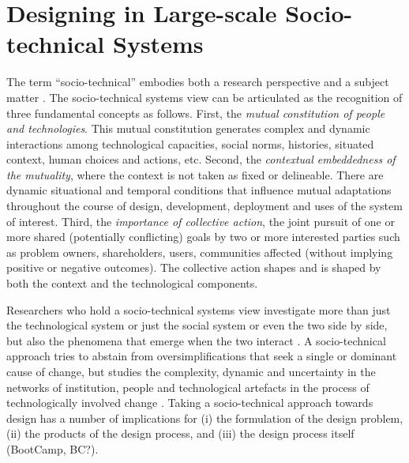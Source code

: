 \section{Designing in Large-scale Socio-technical Systems}
\label{sec:design}

The term ``socio-technical'' embodies both a research perspective and a subject matter \cite{Lee2001}.
The socio-technical systems view can be articulated as the recognition of three fundamental concepts \cite{Sawyer2014} as follows. 
%
First, the \textit{mutual constitution of people and technologies}. This mutual constitution generates complex and dynamic interactions among technological capacities, social norms, histories, situated context, human choices and actions, etc. 
%
Second, the \textit{contextual embeddedness of the mutuality}, where the context is not taken as fixed or delineable. There are dynamic situational and temporal conditions that influence 
mutual adaptations throughout the course of design, development, deployment and uses of the system of interest. 
% 
Third, the \textit{importance of collective action}, the joint pursuit of one or more shared (potentially conflicting) goals by two or more interested parties such as problem owners, shareholders, users, communities affected (without implying positive or negative outcomes). The collective action shapes and is shaped by both the context and the technological components. 

Researchers who hold a socio-technical systems view investigate more than just the technological system or just the social system or even the two side by side, but also the phenomena that emerge when the two interact \cite{Lee2001}. A socio-technical approach tries to abstain from oversimplifications that seek a single or dominant cause of change, but studies the complexity, dynamic and uncertainty in the networks of institution, people and technological artefacts in the process of technologically involved change \cite{Sawyer2014}. 
%
Taking a socio-technical approach towards design has a number of implications for (i) the formulation of the design problem, (ii) the products of the design process, and (iii) the design process itself (BootCamp, BC?).

